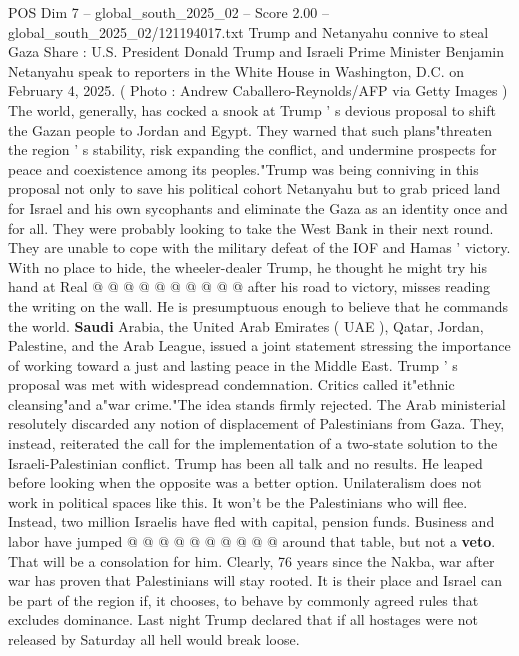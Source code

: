 \begin{textsample}{POS Dim 7 – global\_south\_2025\_02 – Score 2.00 – global\_south\_2025\_02/121194017.txt}  \label{ex:f7_pos_180}
Trump and Netanyahu connive to steal Gaza Share : U.S.
President Donald Trump and Israeli Prime Minister Benjamin Netanyahu speak to reporters in the White House in Washington, D.C. on February 4, 2025. ( Photo : Andrew Caballero-Reynolds/AFP via Getty Images ) The world, generally, has cocked a snook at Trump ' s devious proposal to shift the Gazan people to Jordan and Egypt.
They warned that such plans"threaten the region ' s stability, risk expanding the conflict, and undermine prospects for peace and coexistence among its peoples."Trump was being conniving in this proposal not only to save his political cohort Netanyahu but to grab priced land for Israel and his own sycophants and eliminate the Gaza as an identity once and for all.
They were probably looking to take the West Bank in their next round.
They are unable to cope with the military defeat of the IOF and Hamas ' victory.
With no place to hide, the wheeler-dealer Trump, he thought he might try his hand at Real @ @ @ @ @ @ @ @ @ @ after his road to victory, misses reading the writing on the wall.
He is presumptuous enough to believe that he commands the world. \textbf{Saudi} Arabia, the United Arab Emirates ( UAE ), Qatar, Jordan, Palestine, and the Arab League, issued a joint statement stressing the importance of working toward a just and lasting peace in the Middle East.
Trump ' s proposal was met with widespread condemnation.
Critics called it"ethnic cleansing"and a"war crime."The idea stands firmly rejected.
The Arab ministerial resolutely discarded any notion of displacement of Palestinians from Gaza.
They, instead, reiterated the call for the implementation of a two-state solution to the Israeli-Palestinian conflict.
Trump has been all talk and no results.
He leaped before looking when the opposite was a better option.
Unilateralism does not work in political spaces like this.
It won't be the Palestinians who will flee.
Instead, two million Israelis have fled with capital, pension funds.
Business and labor have jumped @ @ @ @ @ @ @ @ @ @ around that table, but not a \textbf{veto}.
That will be a consolation for him.
Clearly, 76 years since the Nakba, war after war has proven that Palestinians will stay rooted.
It is their place and Israel can be part of the region if, it chooses, to behave by commonly agreed rules that excludes dominance.
Last night Trump declared that if all hostages were not released by Saturday all hell would break loose.

\end{textsample}
